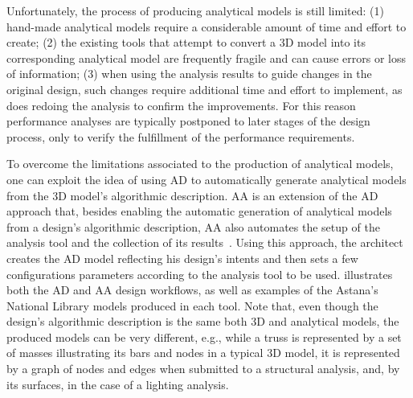 Unfortunately, the process of producing analytical models is still limited: (1) hand-made analytical models require a considerable amount of time and effort to create; (2) the existing tools that attempt to convert a 3D model into its corresponding analytical model are frequently fragile and can cause errors or loss of information; (3) when using the analysis results to guide changes in the original design, such changes require additional time and effort to implement, as does redoing the analysis to confirm the improvements. For this reason performance analyses are typically postponed to later stages of the design process, only to verify the fulfillment of the performance requirements.

To overcome the limitations associated to the production of analytical models, one can exploit the idea of using \ac{AD} to automatically generate analytical models from the 3D model's algorithmic description. \ac{AA} is an extension of the \ac{AD} approach that, besides enabling the automatic generation of analytical models from a design's algorithmic description, \ac{AA} also automates the setup of the analysis tool and the collection of its results~\cite{Aguiar2017}. Using this approach, the architect creates the \ac{AD} model reflecting his design's intents and then sets a few configurations parameters according to the analysis tool to be used.  illustrates both the \ac{AD} and \ac{AA} design workflows, as well as examples of the Astana's National Library models produced in each tool. Note that, even though the design's algorithmic description is the same both 3D and analytical models, the produced models can be very different, e.g., while a truss is represented by a set of masses illustrating its bars and nodes in a typical 3D model, it is represented by a graph of nodes and edges when submitted to a structural analysis, and, by its surfaces, in the case of a lighting analysis.

